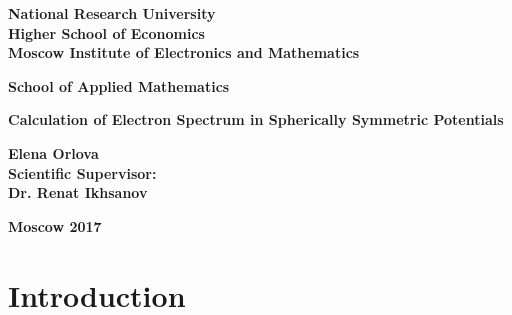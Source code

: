 \documentclass[a4paper, 12pt]{article}
\begin{document}
	\thispagestyle{empty}
	\begin{center}
		\large
		\textbf{National Research University}			
		\\
		\textbf{Higher School of Economics}									\\[3 cm]
		\textbf{Moscow Institute of Electronics and Mathematics}			\\[2 cm]
									
	\end{center}
	
	\begin{center}
		\large
		\textbf{School of Applied Mathematics}		\\[3 cm]
	\end{center}
	
	
	
	\begin{center}
		\large
		\textbf{Calculation of Electron Spectrum in Spherically Symmetric Potentials}		\\[6 cm]
		
	\end{center}
	
	\begin{flushright}
		\large
		\textbf{Elena Orlova}				\\
		\textbf{Scientific Supervisor:}			\\
		\textbf{Dr. Renat Ikhsanov}		\\
	\end{flushright}
	
	\vfill
	\begin{center}
		\large
		\textbf{Moscow 2017}
	\end{center}
	\pagebreak
	
	
	


\tableofcontents
\pagebreak


	
\section{Introduction}
\end{document}
